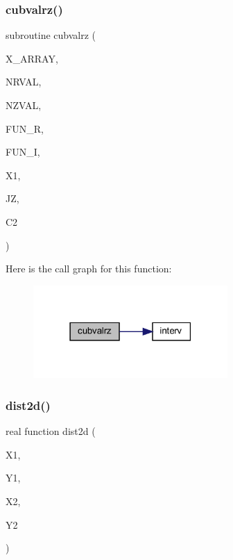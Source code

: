 \subsubsection{\texorpdfstring{cubvalrz()}{cubvalrz()}}
{\footnotesize\ttfamily subroutine cubvalrz (\begin{DoxyParamCaption}\item[{real, dimension(nrval)}]{X\+\_\+\+A\+R\+R\+AY,  }\item[{integer}]{N\+R\+V\+AL,  }\item[{integer}]{N\+Z\+V\+AL,  }\item[{real, dimension(4,nrval,nzval)}]{F\+U\+N\+\_\+R,  }\item[{real, dimension(4,nrval,nzval)}]{F\+U\+N\+\_\+I,  }\item[{real}]{X1,  }\item[{integer}]{JZ,  }\item[{complex}]{C2 }\end{DoxyParamCaption})}

Here is the call graph for this function\+:\nopagebreak
\begin{figure}[H]
\begin{center}
\leavevmode
\includegraphics[width=210pt]{Leroi__c_8f90_a7ac3bb5f2b2d31402aa81424ee2be857_cgraph}
\end{center}
\end{figure}
\mbox{\label{Leroi__c_8f90_a173fbca69518ee77703afb9c67d3e4f0}} 
\subsubsection{\texorpdfstring{dist2d()}{dist2d()}}
{\footnotesize\ttfamily real function dist2d (\begin{DoxyParamCaption}\item[{real}]{X1,  }\item[{real}]{Y1,  }\item[{real}]{X2,  }\item[{real}]{Y2 }\end{DoxyParamCaption})}

